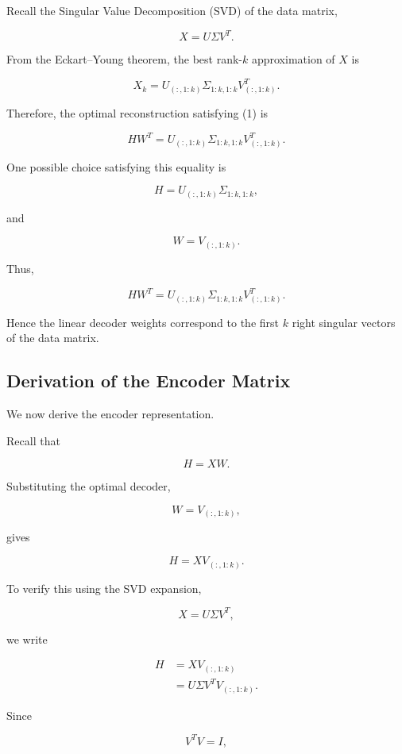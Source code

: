 \documentclass{article}
\begin{document}
Recall the Singular Value Decomposition (SVD) of the data matrix,

\[
\boxed{
	X=U\Sigma V^{T}.
}
\]

From the Eckart--Young theorem, the best rank-$k$ approximation of $X$ is

\[
\boxed{
	X_k
	=
	U_{(:,1:k)}
	\Sigma_{1:k,1:k}
	V_{(:,1:k)}^{T}.
}
\]

Therefore, the optimal reconstruction satisfying (1) is

\[
\boxed{
	HW^{T}
	=
	U_{(:,1:k)}
	\Sigma_{1:k,1:k}
	V_{(:,1:k)}^{T}.
}
\]

One possible choice satisfying this equality is

\[
\boxed{
	H
	=
	U_{(:,1:k)}
	\Sigma_{1:k,1:k},
}
\]

and

\[
\boxed{
	W
	=
	V_{(:,1:k)}.
}
\]

Thus,

\[
HW^{T}
=
U_{(:,1:k)}
\Sigma_{1:k,1:k}
V_{(:,1:k)}^{T}.
\]

Hence the linear decoder weights correspond to the first $k$ right singular
vectors of the data matrix.

\subsection{Derivation of the Encoder Matrix}

We now derive the encoder representation.

Recall that

\[
H=XW.
\]

Substituting the optimal decoder,

\[
W
=
V_{(:,1:k)},
\]

gives

\[
H
=
XV_{(:,1:k)}.
\]

To verify this using the SVD expansion,

\[
X
=
U\Sigma V^{T},
\]

we write

\[
\begin{aligned}
	H
	&=
	XV_{(:,1:k)}
	\\
	&=
	U\Sigma V^{T}V_{(:,1:k)}.
\end{aligned}
\]

Since

\[
V^{T}V=I,
\]
\end{document}
